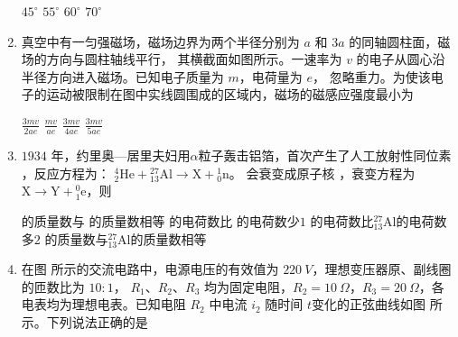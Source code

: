 \begin{enumerate}
\fourchoices
{$ 45 ^{ \circ } $}
{$ 55 ^{ \circ } $}
{$ 60 ^{ \circ } $}
{$ 70 ^{ \circ } $}






\item
真空中有一匀强磁场，磁场边界为两个半径分别为 $ a $ 和 $ 3a $ 的同轴圆柱面，磁场的方向与圆柱轴线平行，
其横截面如图所示。一速率为 $ v $ 的电子从圆心沿半径方向进入磁场。已知电子质量为 $ m $，电荷量为 $ e $，
忽略重力。为使该电子的运动被限制在图中实线圆围成的区域内，磁场的磁感应强度最小为  
\begin{figure}[h!]
\centering

\end{figure}


\fourchoices
{$\frac{3 m v}{2 a e}$}
{$\frac{m v}{a e}$}
{$\frac{3 m v}{4 a e}$}
{$\frac{3 m v}{5 a e}$}







\item
$ 1934 $ 年，约里奥—居里夫妇用$ \alpha $粒子轰击铝箔，首次产生了人工放射性同位素  ，反应方程为：
${ }_{2}^{4} \mathrm{He}+{ }_{13}^{27} \mathrm{Al} \rightarrow \mathrm{X}+{ }_{0}^{1} \mathrm{n}$。  会衰变成原子核  ，衰变方程为 $\mathrm{X} \rightarrow \mathrm{Y}+{ }_{1}^{0} \mathrm{e}$，则  


\fourchoices
{ 的质量数与  的质量数相等}
{ 的电荷数比  的电荷数少$ 1 $}
{ 的电荷数比${ }_{13}^{27} \mathrm{Al}$的电荷数多$ 2 $}
{ 的质量数与${ }_{13}^{27} \mathrm{Al}$的质量数相等}




\item
在图  所示的交流电路中，电源电压的有效值为 $ 220 \ V $，理想变压器原、副线圈的匝数比为 $ 10:1 $，
$ R_{1} $、$ R_{2} $、$ R_{3} $ 均为固定电阻，$ R_{2} =10 \ \Omega $，$ R_{3} =20 \ \Omega $，各电表均为理想电表。已知电阻 $ R_{2} $ 中电流 $ i_{2} $ 随时间 $ t $变化的正弦曲线如图  所示。下列说法正确的是  
\begin{figure}[h!]
\centering
\begin{subfigure}{0.4\linewidth}
\centering
 
\caption{}\label{2020:全国3:7a}
\end{subfigure}
\hfil
\begin{subfigure}{0.4\linewidth}
\centering
 
\caption{}\label{2020:全国3:7b}
\end{subfigure}
\end{figure}



\end{enumerate}
